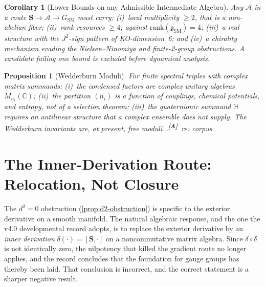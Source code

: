 \documentclass[12pt,a4paper,twoside]{article}
\theoremstyle{plain}
\newtheorem{proposition}[theorem]{Proposition}
\newtheorem{corollary}[theorem]{Corollary}
\theoremstyle{definition}
\theoremstyle{remark}
\newcommand{\catmark}[1]{\textsuperscript{\textsf{\textbf{[#1]}}}}
\begin{document}
\begin{corollary}[Lower Bounds on any Admissible Intermediate Algebra]
\label{cor:algebra-lower-bounds}
Any $\mathcal A$ in a route $\mathbf S \to \mathcal A \to
G_{\mathrm{SM}}$ must carry: (i)~local multiplicity $\geq 2$, that is a
non-abelian fiber; (ii)~rank resources $\geq 4$, against
$\mathrm{rank}(\mathfrak g_{\mathrm{SM}}) = 4$; (iii)~a real structure
with the $J^2$-sign pattern of KO-dimension~6; and (iv)~a chirality
mechanism evading the Nielsen--Ninomiya and finite-2-group obstructions.
A candidate failing one bound is excluded before dynamical analysis.
\end{corollary}

\begin{proposition}[Wedderburn Moduli]
\label{prop:wedderburn-moduli}
For finite spectral triples with complex matrix summands: (i)~the
condensed factors are complex unitary algebras $M_{n_i}(\mathbb C)$;
(ii)~the partition $(n_i)$ is a function of couplings, chemical
potentials, and entropy, not of a selection theorem; (iii)~the
quaternionic summand $\mathbb H$ requires an antilinear structure that a
complex ensemble does not supply. The Wedderburn invariants are, at
present, free moduli~\cite{cacic2011}.\catmark{A}\ \emph{re: corpus}
\end{proposition}

\section{The Inner-Derivation Route: Relocation, Not Closure}
\label{sec:inner-derivation}

\noindent The $d^2 = 0$ obstruction (\cref{prop:d2-obstruction}) is
specific to the exterior derivative on a smooth manifold. The natural
algebraic response, and the one the v4.0 developmental record adopts, is
to replace the exterior derivative by an \emph{inner derivation}
$\delta(\cdot) = [\mathbf S, \cdot]$ on a noncommutative matrix algebra.
Since $\delta \circ \delta$ is not identically zero, the nilpotency that
killed the gradient route no longer applies, and the record concludes
that the foundation for gauge groups has thereby been laid. That
conclusion is incorrect, and the correct statement is a sharper negative
result.
\end{document}
